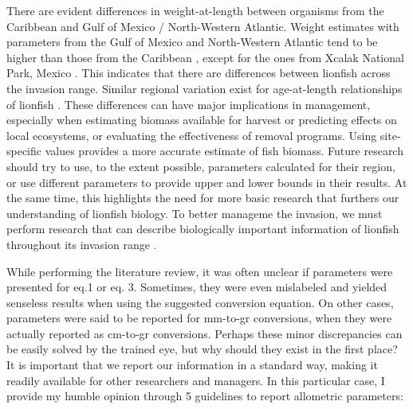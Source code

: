 \documentclass[fleqn,10pt,lineno]{wlpeerj} %
\theoremstyle{definition}
\theoremstyle{definition}
\theoremstyle{definition}
\theoremstyle{remark}
\begin{document}
There are evident differences in weight-at-length between organisms from
the Caribbean and Gulf of Mexico / North-Western Atlantic. Weight
estimates with parameters from the Gulf of Mexico and North-Western
Atlantic
\citep{barbour_2011,fogg_2013,aguilarperera_2016,sabidoitza_2016} tend
to be higher than those from the Caribbean
\citep{edwards_2014,chin_2016,deleon_2013,sandel_2015}, except for the
ones from Xcalak National Park, Mexico \citep{sabidoitza_2016}. This
indicates that there are differences between lionfish across the
invasion range. Similar regional variation exist for age-at-length
relationships of lionfish \citep{fogg_2015}. These differences can have
major implications in management, especially when estimating biomass
available for harvest or predicting effects on local ecosystems, or
evaluating the effectiveness of removal programs. Using site-specific
values provides a more accurate estimate of fish biomass. Future
research should try to use, to the extent possible, parameters
calculated for their region, or use different parameters to provide
upper and lower bounds in their results. At the same time, this
highlights the need for more basic research that furthers our
understanding of lionfish biology. To better manageme the invasion, we
must perform research that can describe biologically important
information of lionfish throughout its invasion range
\citep{johnson_2016}.

While performing the literature review, it was often unclear if
parameters were presented for eq.1 or eq. 3. Sometimes, they were even
mislabeled and yielded senseless results when using the suggested
conversion equation. On other cases, parameters were said to be reported
for mm-to-gr conversions, when they were actually reported as cm-to-gr
conversions. Perhaps these minor discrepancies can be easily solved by
the trained eye, but why should they exist in the first place? It is
important that we report our information in a standard way, making it
readily available for other researchers and managers. In this particular
case, I provide my humble opinion through 5 guidelines to report
allometric parameters:
\end{document}
